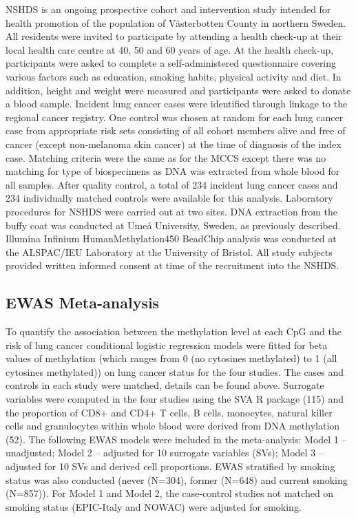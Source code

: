 \documentclass[11pt,twoside]{bristolthesis}
\begin{document}
NSHDS is an ongoing prospective cohort and intervention study intended for health promotion of the population of Västerbotten County in northern Sweden. All residents were invited to participate by attending a health check-up at their local health care centre at 40, 50 and 60 years of age. At the health check-up, participants were asked to complete a self-administered questionnaire covering various factors such as education, smoking habits, physical activity and diet. In addition, height and weight were measured and participants were asked to donate a blood sample. Incident lung cancer cases were identified through linkage to the regional cancer registry. One control was chosen at random for each lung cancer case from appropriate risk sets consisting of all cohort members alive and free of cancer (except non-melanoma skin cancer) at the time of diagnosis of the index case. Matching criteria were the same as for the MCCS except there was no matching for type of biospecimens as DNA was extracted from whole blood for all samples. After quality control, a total of 234 incident lung cancer cases and 234 individually matched controls were available for this analysis. Laboratory procedures for NSHDS were carried out at two sites. DNA extraction from the buffy coat was conducted at Umeå University, Sweden, as previously described. Illumina Infinium HumanMethylation450 BeadChip analysis was conducted at the ALSPAC/IEU Laboratory at the University of Bristol. All study subjects provided written informed consent at time of the recruitment into the NSHDS.

\hypertarget{ewas-meta-analysis}{%
\subsection{EWAS Meta-analysis}\label{ewas-meta-analysis}}

To quantify the association between the methylation level at each CpG and the risk of lung cancer conditional logistic regression models were fitted for beta values of methylation (which ranges from 0 (no cytosines methylated) to 1 (all cytosines methylated)) on lung cancer status for the four studies. The cases and controls in each study were matched, details can be found above. Surrogate variables were computed in the four studies using the SVA R package (115) and the proportion of CD8+ and CD4+ T cells, B cells, monocytes, natural killer cells and granulocytes within whole blood were derived from DNA methylation (52). The following EWAS models were included in the meta-analysis: Model 1 -- unadjusted; Model 2 -- adjusted for 10 surrogate variables (SVs); Model 3 -- adjusted for 10 SVs and derived cell proportions. EWAS stratified by smoking status was also conducted (never (N=304), former (N=648) and current smoking (N=857)). For Model 1 and Model 2, the case-control studies not matched on smoking status (EPIC-Italy and NOWAC) were adjusted for smoking.
\end{document}

